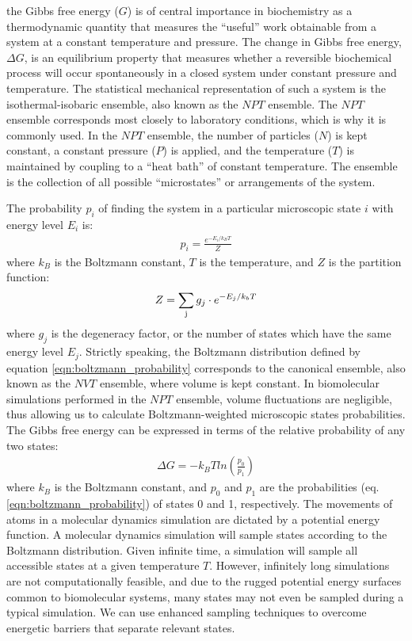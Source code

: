 the Gibbs free energy ($G$) is of central importance in biochemistry as a thermodynamic quantity that measures the ``useful'' work obtainable from a system at a constant temperature and pressure. The change in Gibbs free energy, $\Delta G$, is an equilibrium property that measures whether a reversible biochemical process will occur spontaneously in a closed system under constant pressure and temperature. The statistical mechanical representation of such a system is the isothermal-isobaric ensemble, also known as the $NPT$ ensemble. The $NPT$ ensemble corresponds most closely to laboratory conditions, which is why it is commonly used. In the $NPT$ ensemble, the number of particles ($N$) is kept constant, a constant pressure ($P$) is applied, and the temperature ($T$) is maintained by coupling to a ``heat bath'' of constant temperature. The ensemble is the collection of all possible ``microstates'' or arrangements of the system.

The probability $p_i$ of finding the system in a particular microscopic state $i$ with energy level $E_i$ is:
\begin{align}
\label{eqn:boltzmann_probability}
p_i = \frac{e^{-E_i/k_{B}T}}{Z}
\end{align}
where $k_{B}$ is the Boltzmann constant, $T$ is the temperature, and $Z$ is the partition function:
\begin{align}
\label{eqn:boltzmann_partition}
Z = \mathop{\sum}_{\rm j} g_j \cdot e^{-E_j/k_{b}T}
\end{align}
where $g_j$ is the degeneracy factor, or the number of states which have the same energy level $E_j$. Strictly speaking, the Boltzmann distribution defined by equation \ref{eqn:boltzmann_probability} corresponds to the canonical ensemble, also known as the $NVT$ ensemble, where volume is kept constant. In biomolecular simulations performed in the $NPT$ ensemble, volume fluctuations are negligible, thus allowing us to calculate Boltzmann-weighted microscopic states probabilities. The Gibbs free energy can be expressed in terms of the relative probability of any two states:
\begin{align}
\label{eqn:gibbs_boltzmann}
\Delta G = -k_{B}Tln \left( \frac{p_0}{p_1} \right)
\end{align}
where $k_{B}$ is the Boltzmann constant, and $p_0$ and $p_1$ are the probabilities (eq. \ref{eqn:boltzmann_probability}) of states 0 and 1, respectively. The movements of atoms in a molecular dynamics simulation are dictated by a potential energy function. A molecular dynamics simulation will sample states according to the Boltzmann distribution. Given infinite time, a simulation will sample all accessible states at a given temperature $T$. However, infinitely long simulations are not computationally feasible, and due to the rugged potential energy surfaces common to biomolecular systems, many states may not even be sampled during a typical simulation. We can use enhanced sampling techniques to overcome energetic barriers that separate relevant states.

